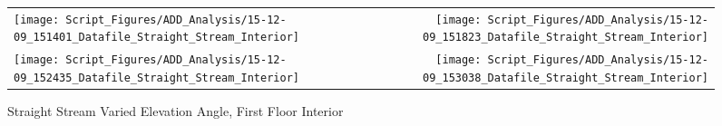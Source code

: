 \documentclass{article}
\begin{document}
\clearpage

\begin{figure}[ht]
\begin{tabular*}{\textwidth}{lr}
\texttt{[image: Script\_Figures/ADD\_Analysis/15-12-09\_151401\_Datafile\_Straight\_Stream\_Interior]} &
\texttt{[image: Script\_Figures/ADD\_Analysis/15-12-09\_151823\_Datafile\_Straight\_Stream\_Interior]} \\
\texttt{[image: Script\_Figures/ADD\_Analysis/15-12-09\_152435\_Datafile\_Straight\_Stream\_Interior]} &
\texttt{[image: Script\_Figures/ADD\_Analysis/15-12-09\_153038\_Datafile\_Straight\_Stream\_Interior]} \\
\end{tabular*}
\caption{Straight Stream Varied Elevation Angle, First Floor Interior}
\label{fig:Straight Stream Varied Elevation Angle, First Floor Interior}
\end{figure}
\end{document}
